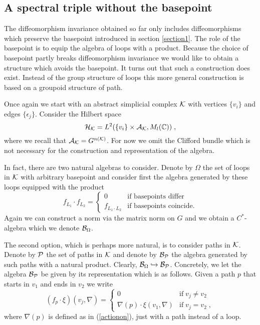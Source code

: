 \documentclass[12pt]{article}
\def\e{\epsilon}
\def\OO{\Omega}
\def\ca{{\cal A}}
\def\cb{{\cal B}}
\def\ch{{\cal H}}
\def\ck{{\cal K}}
\def\cp{{\cal P}}
\begin{document}
\begin{appendix}





\section{A spectral triple without the basepoint}
\label{Appendix}

The diffeomorphism invariance obtained so far only includes diffeomorphisms which preserve the basepoint introduced in section \ref{section1}.
The role of the basepoint is to equip the algebra of loops with a product. Because the choice of basepoint partly breaks diffeomorphism invariance we would like to obtain a structure which avoids the basepoint.
 It turns out that such a construction does exist. Instead of the group structure of loops this more general construction is based on a groupoid structure of path. 



 
Once again we start with an abstract simplicial complex $\ck$ with vertices $\{v_i\}$ and edges $\{\e_j\}$. Consider the Hilbert space
\[
\ch_{\ck} = L^2(\{v_i\}\times \ca_{\ck},M_l(\mathbb{C}))\;,
\]
where we recall that $\ca_{\ck}=G^{n(\ck)}$. For now we omit the Clifford bundle which is not necessary for the construction and representation of the algebra.

In fact, there are two natural algebras to consider. Denote by $\OO$ the set of loops in $\ck$ with arbitrary basepoint and consider first the algebra generated by these loops equipped with the product
\[
f_{L_1}\cdot f_{L_2}= \left\{ \begin{array}{ll}
0 & \mbox{if basepoints differ} \\
f_{L_1\cdot L_2} & \mbox{if basepoints coincide.}  
                              \end{array}\right.
\]
Again we can construct a norm via the matrix norm on $G$ and we obtain a $C^\ast$-algebra which we denote $\cb_{\OO}$.

The second option, which is perhaps more natural, is to consider paths in $\ck$. Denote by $\cp$ the set of paths in $\ck$ and denote by $\cb_{\cp}$ the algebra generated by such paths with a natural product. Clearly, $\cb_{\OO}\hookrightarrow \cb_{\cp}$. Concretely, we let the algebra $\cb_\cp$ be given by its representation
which is as follows. Given a path $p$ that starts in $v_1$ and ends in $v_2$ we write
\[
(f_p \cdot \xi) (v_j,\nabla) =\left\{ \begin{array}{ll}
0 & \mbox{if}\; v_j\not= v_2  \\
\nabla(p)\cdot \xi(v_1,\nabla) & \mbox{if}\; v_j=v_2\;,  
                              \end{array}\right.
\]
where $\nabla(p)$ is defined as in (\ref{actionon}), just with a path instead of a loop.


\end{appendix}
\end{document}
